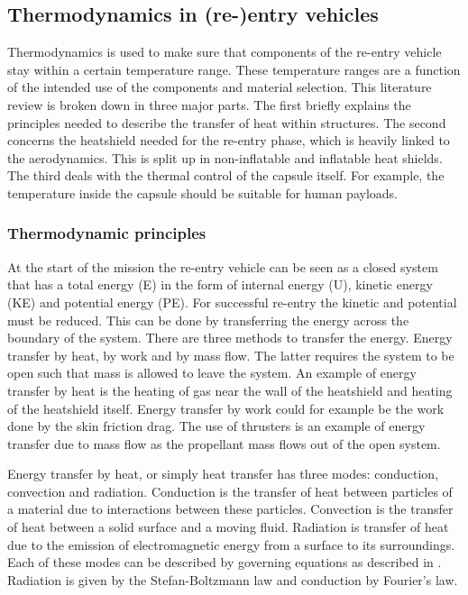 \subsection{Thermodynamics in (re-)entry vehicles}\label{sec:thermo}
Thermodynamics is used to make sure that components of the re-entry vehicle stay within a certain temperature range. These temperature ranges are a function of the intended use of the components and material selection. This literature review is broken down in three major parts. The first briefly explains the principles needed to describe the transfer of heat within structures. The second concerns the heatshield needed for the re-entry phase, which is heavily linked to the aerodynamics. This is split up in non-inflatable and inflatable heat shields. The third deals with the thermal control of the capsule itself. For example, the temperature inside the capsule should be suitable for human payloads.

\subsubsection{Thermodynamic principles}
At the start of the mission the re-entry vehicle can be seen as a closed system that has a total energy (E) in the form of internal energy (U), kinetic energy (KE) and potential energy (PE). For successful re-entry the kinetic and potential must be reduced. This can be done by transferring the energy across the boundary of the system. There are three methods to transfer the energy. Energy transfer by heat, by work and by mass flow. The latter requires the system to be open such that mass is allowed to leave the system. \cite{Cengel2010} An example of energy transfer by heat is the heating of gas near the wall of the heatshield and heating of the heatshield itself. Energy transfer by work could for example be the work done by the skin friction drag. The use of thrusters is an example of energy transfer due to mass flow as the propellant mass flows out of the open system. 

Energy transfer by heat, or simply heat transfer has three modes: conduction, convection and radiation. Conduction is the transfer of heat between particles of a material due to interactions between these particles. Convection is the transfer of heat between a solid surface and a moving fluid. Radiation is transfer of heat due to the emission of electromagnetic energy from a surface to its surroundings. \cite{Cengel2010, Karam1998} Each of these modes can be described by governing equations as described in \cite{Holman2002}. Radiation is given by the Stefan-Boltzmann law and conduction by Fourier's law. \cite{Cengel2010, Holman2002}


